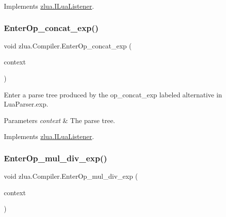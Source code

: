 Implements \mbox{\hyperlink{interfacezlua_1_1_i_lua_listener_a15745713dc5965a0337698761f16947d}{zlua.\+I\+Lua\+Listener}}.

\mbox{\label{classzlua_1_1_compiler_ab34e6520919145a9c302e6847e8b36b7}} 
\subsubsection{\texorpdfstring{Enter\+Op\+\_\+concat\+\_\+exp()}{EnterOp\_concat\_exp()}}
{\footnotesize\ttfamily void zlua.\+Compiler.\+Enter\+Op\+\_\+concat\+\_\+exp (\begin{DoxyParamCaption}\item[{\mbox{[}\+Not\+Null\mbox{]} \mbox{\hyperlink{classzlua_1_1_lua_parser_1_1_op__concat__exp_context}{Lua\+Parser.\+Op\+\_\+concat\+\_\+exp\+Context}}}]{context }\end{DoxyParamCaption})}



Enter a parse tree produced by the {\ttfamily op\+\_\+concat\+\_\+exp} labeled alternative in Lua\+Parser.\+exp. 


\begin{DoxyParams}{Parameters}
{\em context} & The parse tree.\\
\hline
\end{DoxyParams}


Implements \mbox{\hyperlink{interfacezlua_1_1_i_lua_listener_acbbb173b8111f78841067f364c764c2c}{zlua.\+I\+Lua\+Listener}}.

\mbox{\label{classzlua_1_1_compiler_ac79e4b2008ccb00f7209a5dbc9ce7362}} 
\subsubsection{\texorpdfstring{Enter\+Op\+\_\+mul\+\_\+div\+\_\+exp()}{EnterOp\_mul\_div\_exp()}}
{\footnotesize\ttfamily void zlua.\+Compiler.\+Enter\+Op\+\_\+mul\+\_\+div\+\_\+exp (\begin{DoxyParamCaption}\item[{\mbox{[}\+Not\+Null\mbox{]} \mbox{\hyperlink{classzlua_1_1_lua_parser_1_1_op__mul__div__exp_context}{Lua\+Parser.\+Op\+\_\+mul\+\_\+div\+\_\+exp\+Context}}}]{context }\end{DoxyParamCaption})}



